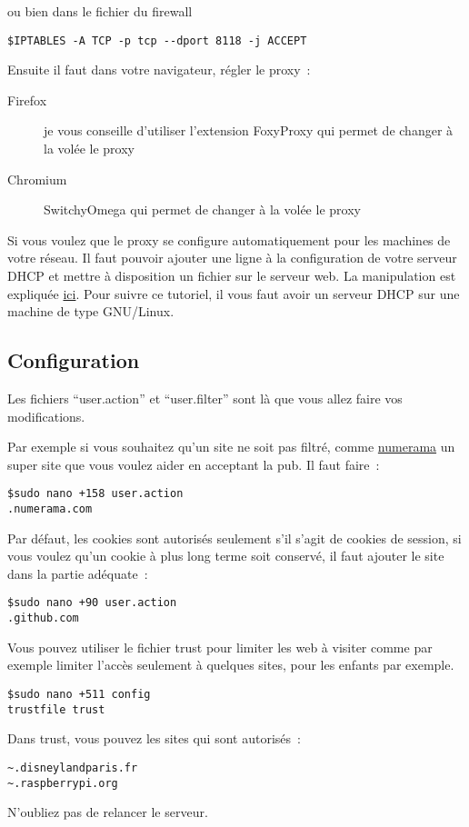 ou bien dans le fichier du firewall

\begin{verbatim}
$IPTABLES -A TCP -p tcp --dport 8118 -j ACCEPT
\end{verbatim}

Ensuite il faut dans votre navigateur, régler le proxy~:
\begin{description}
	\item [Firefox] je vous conseille d'utiliser l'extension FoxyProxy qui permet de changer à la volée le proxy
	\item [Chromium] SwitchyOmega qui permet de changer à la volée le proxy
\end{description}

Si vous voulez que le proxy se configure automatiquement pour les machines de votre réseau. Il faut pouvoir ajouter une ligne à la configuration de votre serveur DHCP et mettre à disposition un fichier sur le serveur web. La manipulation est expliquée \href{https://www.howtoforge.com/squid-proxy-server-on-ubuntu-9.04-server-with-dansguardian-clamav-and-wpad-proxy-auto-detection}{ici}. Pour suivre ce tutoriel, il vous faut avoir un serveur DHCP sur une machine de type GNU/Linux.

\subsection{Configuration}

Les fichiers ``user.action'' et ``user.filter'' sont là que vous allez faire vos modifications.

Par exemple si vous souhaitez qu'un site ne soit pas filtré, comme \href{numerama.com}{numerama} un super site que vous voulez aider en acceptant la pub. Il faut faire~:

\begin{verbatim}
$sudo nano +158 user.action
.numerama.com
\end{verbatim}

Par défaut, les cookies sont autorisés seulement s'il s'agit de cookies de session, si vous voulez qu'un cookie à plus long terme soit conservé, il faut ajouter le site dans la partie adéquate~:
\begin{verbatim}
$sudo nano +90 user.action
.github.com
\end{verbatim}

Vous pouvez utiliser le fichier trust pour limiter les web à visiter comme par exemple limiter l'accès seulement à quelques sites, pour les enfants par exemple.

\begin{verbatim}
$sudo nano +511 config
trustfile trust
\end{verbatim}

Dans trust, vous pouvez les sites qui sont autorisés~:
\begin{verbatim}
~.disneylandparis.fr
~.raspberrypi.org
\end{verbatim}

N'oubliez pas de relancer le serveur.
